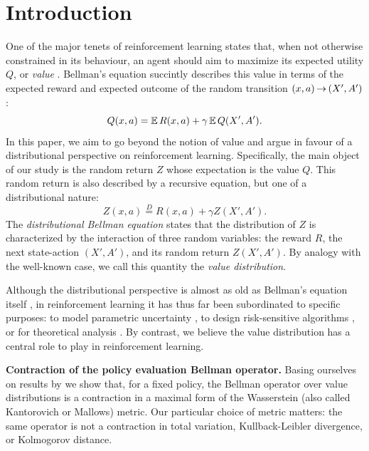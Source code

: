 \documentclass{article}
\def \Deq {\overset{D}{=}}
\begin{document}
\section{Introduction}
One of the major tenets of reinforcement learning states that, when not otherwise constrained in its behaviour, an agent should aim to maximize its expected utility $Q$, or \emph{value} \citep{sutton98reinforcement}. Bellman's equation succintly describes this value in terms of the expected reward and expected outcome of the random transition $(x, a) \hspace{-0.1em} \to \hspace{-0.1em}  (X', A')$:
\begin{equation*}
%
Q(x,a) = \expect R(x,a) + \gamma \expect Q(X', A') .
\end{equation*}
%
%
In this paper, we aim to go beyond the notion of value and argue in favour of a distributional perspective on reinforcement learning.
%
Specifically, the main object of our study is the random return $Z$ whose expectation is the value $Q$. This random return is also described by a recursive equation, but one of a distributional nature:
\begin{equation*}
Z(x,a) \Deq R(x,a) + \gamma Z(X', A').
\end{equation*}
The \emph{distributional Bellman equation} states that the distribution of $Z$ is characterized by the interaction of three random variables: the reward $R$, the next state-action $(X', A')$, and its random return $Z(X', A')$. By analogy with the well-known case, we call this quantity the \emph{value distribution}.

Although the distributional perspective is almost as old as Bellman's equation itself \citep{jaquette73markov,sobel82variance,white88mean}, in reinforcement learning it has thus far been subordinated to specific purposes: to model parametric uncertainty \citep{dearden98bayesian}, to design risk-sensitive algorithms \citep{morimura2010nonparametric,morimura10parametric}, or for theoretical analysis \citep{azar12sample,lattimore12pac}.
By contrast, we believe the value distribution has a central role to play in reinforcement learning.

\textbf{Contraction of the policy evaluation Bellman operator.} Basing ourselves on results by \citet{rosler92fixed} we show that, for a fixed policy, the Bellman operator over value distributions is a contraction in a maximal form of the Wasserstein (also called Kantorovich or Mallows) metric. Our particular choice of metric matters: the same operator is not a contraction in total variation, Kullback-Leibler divergence, or Kolmogorov distance.
\end{document}
